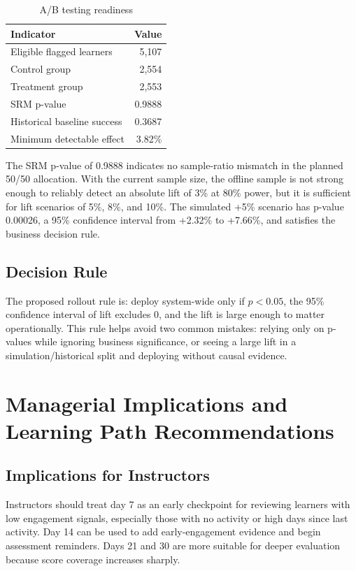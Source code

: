 \documentclass[conference]{IEEEtran}
\begin{document}
\begin{table}[H]
\centering
\footnotesize
\caption{A/B testing readiness}
\label{tab:ab}
\begin{tabular}{lr}
\toprule
Indicator & Value \\
\midrule
Eligible flagged learners & 5,107 \\
Control group & 2,554 \\
Treatment group & 2,553 \\
SRM p-value & 0.9888 \\
Historical baseline success & 0.3687 \\
Minimum detectable effect & 3.82\% \\
\bottomrule
\end{tabular}
\end{table}

The SRM p-value of 0.9888 indicates no sample-ratio mismatch in the planned 50/50 allocation. With the current sample size, the offline sample is not strong enough to reliably detect an absolute lift of 3\% at 80\% power, but it is sufficient for lift scenarios of 5\%, 8\%, and 10\%. The simulated +5\% scenario has p-value 0.00026, a 95\% confidence interval from +2.32\% to +7.66\%, and satisfies the business decision rule.

\subsection{Decision Rule}

The proposed rollout rule is: deploy system-wide only if \(p < 0.05\), the 95\% confidence interval of lift excludes 0, and the lift is large enough to matter operationally. This rule helps avoid two common mistakes: relying only on p-values while ignoring business significance, or seeing a large lift in a simulation/historical split and deploying without causal evidence.

\section{Managerial Implications and Learning Path Recommendations}

\subsection{Implications for Instructors}

Instructors should treat day 7 as an early checkpoint for reviewing learners with low engagement signals, especially those with no activity or high days since last activity. Day 14 can be used to add early-engagement evidence and begin assessment reminders. Days 21 and 30 are more suitable for deeper evaluation because score coverage increases sharply.
\end{document}

